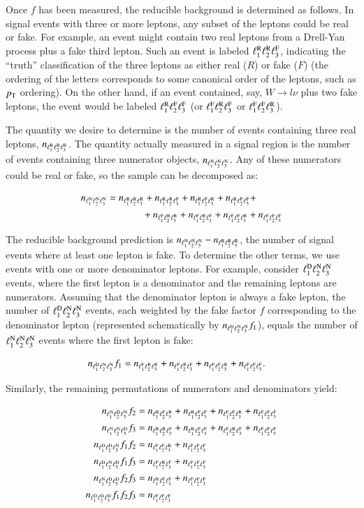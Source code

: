 Once $f$ has been measured, the reducible background is determined as follows. In signal events with three or more leptons, any subset of the leptons could be real or fake. For example, an event might contain two real leptons from a Drell-Yan process plus a fake third lepton. Such an event is labeled $\RRF$, indicating the ``truth'' classification of the three leptons as either real ($R$) or fake ($F$) (the ordering of the letters corresponds to some canonical order of the leptons, such as $\pt$ ordering). On the other hand, if an event contained, say, $W\rightarrow l\nu$ plus two fake leptons, the event would be labeled $\RFF$ (or $\FRF$ or $\FFR$). 

The quantity we desire to determine is the number of events containing three real leptons, $n_{\RRR}$. The quantity actually measured in a signal region is the number of events containing three numerator objects, $n_{\NNN}$. Any of these numerators could be real or fake, so the sample can be decomposed as:

\begin{align}
	n_{\NNN} & = n_{\RRR} + n_{\RRF} + n_{\RFR} + n_{\RFF} +\\
	&  \hspace{0.5in} + n_{\FRR} + n_{\FRF} + n_{\FFR} + n_{\FFF}
\end{align}

The reducible background prediction is $n_{\NNN}-n_{\RRR}$, the number of signal events where at least one lepton is fake. To determine the other terms, we use events with one or more denominator leptons. For example, consider $\DNN$ events, where the first lepton is a denominator and the remaining leptons are numerators. Assuming that the denominator lepton is always a fake lepton, the number of $\DNN$ events, each weighted by the fake factor $f$ corresponding to the denominator lepton (represented schematically by $n_{\DNN}f_{1}$), equals the number of $\NNN$ events where the first lepton is fake:

\begin{align}
	n_{\DNN} f_{1} &= n_{\FRR} + n_{\FRF} + n_{\FFR} + n_{\FFF}.
\end{align}

Similarly, the remaining permutations of numerators and denominators yield:

\begin{align}
	n_{\NDN} f_{2} &= n_{\RFR} + n_{\RFF} + n_{\FFR} + n_{\FFF} \\
	n_{\NND} f_{3} &= n_{\RRF} + n_{\RFF} + n_{\FRF} + n_{\FFF} \\
	n_{\DDN} f_{1}f_{2} &= n_{\FFR} + n_{\FFF} \\
	n_{\DND} f_{1}f_{3} &= n_{\FRF} + n_{\FFF} \\
	n_{\NDD} f_{2}f_{3} &= n_{\RFF} + n_{\FFF} \\
	n_{\DDD} f_{1}f_{2}f_{3} &= n_{\FFF}
\end{align}

